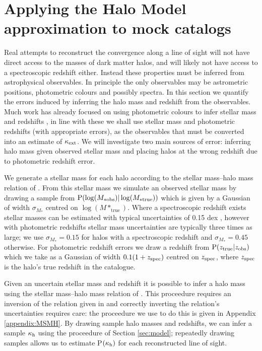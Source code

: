 \documentclass[useAMS,usenatbib]{mn2e}
\begin{document}

\section{Applying the Halo Model approximation to mock catalogs}
\label{sec:obsMstar+z}

Real attempts to reconstruct the convergence along a line of sight will not have direct access to the masses of dark matter halos, 
and will likely not have access to a spectroscopic redshift either. Instead these properties must be inferred from astrophysical
observables. In principle the only observables may be astrometric positions, photometric colours and possibly spectra. In this section we
quantify the errors induced by inferring the halo mass and redshift from the observables. Much work has already focused on using
photometric colours to infer stellar mass \citep[\eg][]{AugerEtal2009} and redshifts \citep[\eg][]{BPZ}, in line with these we shall use
stellar mass and photometric redshifts (with appropriate errors), as the observables that must be converted into an estimate
of $\kappa_{\rm ext}$. We will investigate two main sources of error: inferring halo mass given observed stellar mass and placing halos at the wrong redshift due to photometric redshift error.

We generate a stellar mass for each halo according to the stellar mass--halo mass relation of \citet{BehrooziEtal2009}. From this stellar mass we simulate 
an observed stellar mass by drawing a sample from ${\rm P}(\log(M_{* \mathrm {obs}})|\log(M_{* \mathrm {true}}))$ which is given by a Gaussian of width $\sigma_{M_*}$ centred on $\log(M*_{\mathrm {true}})$. Where a spectroscopic redshift exists stellar masses can be estimated with typical uncertainties of 0.15 dex \citep{AugerEtal2009}, however with photometric redshifts stellar mass uncertainties are typically three times as large; we use $\sigma_{M_*}=0.15$ for halos with a spectroscopic redshift and $\sigma_{M_*}=0.45$ otherwise. For photometric redshift errors we draw a redshift from ${\rm P}(z_{\rm true}|z_{\rm obs})$ which we take as a Gaussian of width $0.1(1+z_{\rm spec})$ centred on $z_{\rm spec}$, where $z_{\rm spec}$ is the halo's true redshift in the \MS catalogue.

Given an uncertain stellar mass and redshift it is possible to infer a halo mass using the stellar mass--halo mass relation of \citet{BehrooziEtal2009}. This proceedure requires an inversion of the relation given in \citet{BehrooziEtal2009} and correctly inverting the relation's uncertainties requires care: the proceedure we use to do this is given in Appendix \ref{appendix:MSMH}. By drawing sample halo masses and redshifts, we can infer a sample $\kappa_{\rm h}$ using the proceedure of Section \ref{sec:model}; repeatedly drawing samples allows us to estimate P$(\kappa_{\rm h})$ for each reconstructed line of sight.
\end{document}
